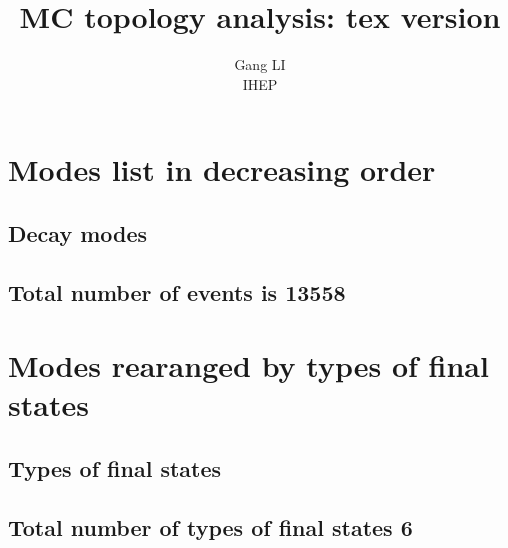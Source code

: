 \documentclass[11pt]{article}
\begin{document}
\title{MC topology analysis: tex version}
\author{Gang LI\\
\small{ IHEP}}
\maketitle

\tableofcontents
\newpage
\section{Modes list in decreasing order}

\subsection{Decay modes }
\begin{landscape}  \end{landscape} \clearpage 
\begin{landscape}  \end{landscape} \clearpage 
\begin{landscape}  \end{landscape} \clearpage 
\begin{landscape}  \end{landscape} \clearpage 
\begin{landscape}  \end{landscape} \clearpage 
\begin{landscape}  \end{landscape} \clearpage  

\subsection{Total number of events is 13558}

\setcounter{table}{0}

\section{Modes rearanged by types of final states}

\subsection{ Types of final states }
\begin{landscape}  \end{landscape} \clearpage

\subsection{ Total number of types of final states 6}
\end{document}
